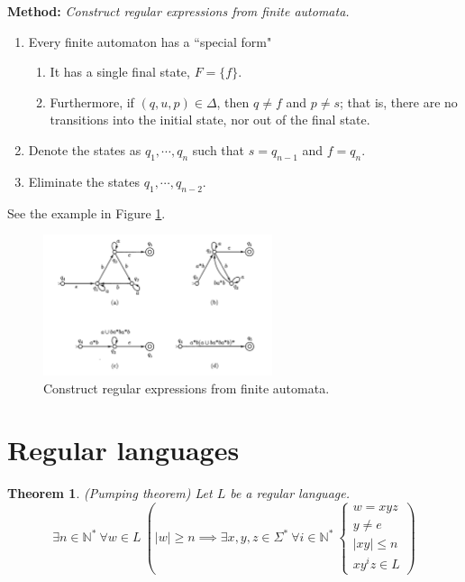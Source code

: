 \documentclass[aps,pra,onecolumn,notitlepage,superscriptaddress]{revtex4-1}
\newcommand{\N}{\mathbb{N}}
\newtheorem{theo}{Theorem}
\begin{document}
    \textbf{Method: }\textit{Construct regular expressions from finite automata.}
    \begin{enumerate}
        \item Every finite automaton has a ``special form"
        \begin{enumerate}
            \item It has a single final state, $F = \{f\}$.
            \item Furthermore, if $(q,u,p) \in \Delta$, then $q \neq f$ and $p \neq s$; that is, there are no transitions into the initial state, nor out of the final state.
        \end{enumerate}
        \item Denote the states as $q_1, \cdots, q_n$ such that $s = q_{n-1}$ and $f = q_n$. 
        \item Eliminate the states $q_1, \cdots, q_{n-2}$.
    \end{enumerate}
    See the example in Figure \ref{fa2reg}.

    \begin{figure}[H]
        \centering
        \includegraphics[width=0.6\textwidth]{fa2reg.png}
        \caption{Construct regular expressions from finite automata.}
        \label{fa2reg}
    \end{figure}

    \section{Regular languages}
    \begin{theo}
        (Pumping theorem) Let $L$ be a regular language. 
        \begin{equation}
            \exists n \in \N^* \ \forall w \in L\ \left(|w| \geq n \implies \exists x,y,z \in \Sigma^* \ \forall i \in \N^* \ \begin{cases}
                w = xyz \\ y \neq e \\ |xy| \leq n \\ xy^iz \in L 
            \end{cases}\right)
        \end{equation}
    \end{theo}
\end{document}

